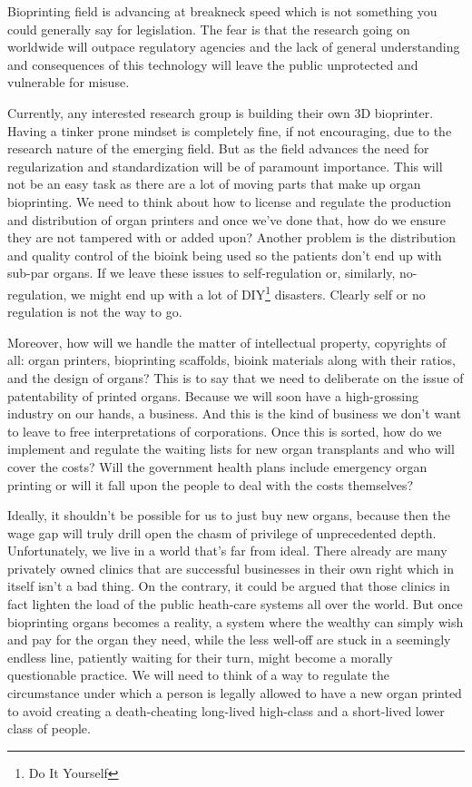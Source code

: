 \documentclass[12pt]{article} %
\begin{document}
Bioprinting field is advancing at breakneck speed which is not something you could generally say for legislation. The fear is that the research going on worldwide will outpace regulatory agencies and the lack of general understanding and consequences of this technology will leave the public unprotected and vulnerable for misuse. 

Currently, any interested research group is building their own 3D bioprinter. Having a tinker prone mindset is completely fine, if not encouraging, due to the research nature of the emerging field. But as the field advances the need for regularization and standardization will be of paramount importance. This will not be an easy task as there are a lot of moving parts that make up organ bioprinting. We need to think about how to license and regulate the production and distribution of organ printers and once we've done that, how do we ensure they are not tampered with or added upon? 
Another problem is the distribution and quality control of the bioink being used so the patients don't end up with sub-par organs. If we leave these issues to self-regulation or, similarly, no-regulation, we might end up with a lot of DIY\footnote{Do It Yourself} disasters. Clearly self or no regulation is not the way to go.

Moreover, how will we handle the matter of intellectual property, copyrights of all: organ printers, bioprinting scaffolds, bioink materials along with their ratios, and the design of organs?  This is to say that we need to deliberate on the issue\footnotemark{} of patentability of printed organs. 
Because we will soon have a high-grossing industry on our hands, a business. And this is the kind of business we don't want to leave to free interpretations of corporations. 
Once this is sorted, how do we implement and regulate the waiting lists for new organ transplants and who will cover the costs? Will the government health plans include emergency organ printing or will it fall upon the people to deal with the costs themselves? 

Ideally, it shouldn't be possible for us to just buy new organs, because then the wage gap will truly drill open the chasm of privilege of unprecedented depth. Unfortunately, we live in a world that's far from ideal. There already are many privately owned clinics that are successful businesses in their own right which in itself isn't a bad thing. 
On the contrary, it could be argued that those clinics in fact lighten the load of the public heath-care systems all over the world. But once bioprinting organs becomes a reality, a system where the wealthy can simply wish and pay for the organ they need, while the less well-off are stuck in a seemingly endless line, patiently waiting for their turn, might become a morally questionable practice. We will need to think of a way to regulate the circumstance under which a person is legally allowed to have a new organ printed to avoid creating a death-cheating long-lived high-class and a short-lived lower class of people.
\end{document}
